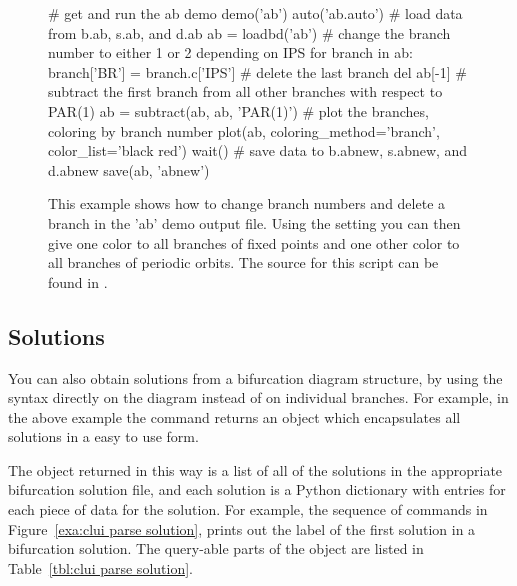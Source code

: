 \documentclass[12pt]{report}
\begin{document}
 \begin{figure}[htbp]
 {\small \begin{center} \begin{boxedverbatim}
 # get and run the ab demo
 demo('ab')
 auto('ab.auto')
 # load data from b.ab, s.ab, and d.ab
 ab = loadbd('ab')
 # change the branch number to either 1 or 2 depending on IPS
 for branch in ab:
     branch['BR'] = branch.c['IPS']
 # delete the last branch
 del ab[-1]
 # subtract the first branch from all other branches with respect to PAR(1)
 ab = subtract(ab, ab, 'PAR(1)')
 # plot the branches, coloring by branch number
 plot(ab, coloring_method='branch', color_list='black red')
 wait()
 # save data to b.abnew, s.abnew, and d.abnew
 save(ab, 'abnew')
 \end{boxedverbatim}
 \end{center} 
 }
 \caption{This example shows how to change branch numbers and delete a
 branch in the 'ab' demo output file. Using
 the  setting you can then give one
 color to all branches of fixed points and one other color to all
 branches of periodic orbits.
 The source for this script can be found in
 .}
 \label{exa:clui branch management}
 \end{figure}

 \subsection{ Solutions}
 You can also obtain solutions from a bifurcation diagram structure,
 by using the \commandf{()} syntax directly on the diagram instead of
 on individual branches.
 For example, in the above example the command
 returns an object which encapsulates
 all solutions in a easy to use form.

 The object returned in this way
 is a list of all of the solutions in the appropriate
 bifurcation solution file, and each solution is a Python
 dictionary with entries for each  piece of
 data for the solution.  For example, the sequence of commands
 in Figure~\ref{exa:clui parse solution}, prints out the
 label of the first solution in a bifurcation solution.
 The query-able parts of the object are listed in
 Table~\ref{tbl:clui parse solution}.
\end{document}
